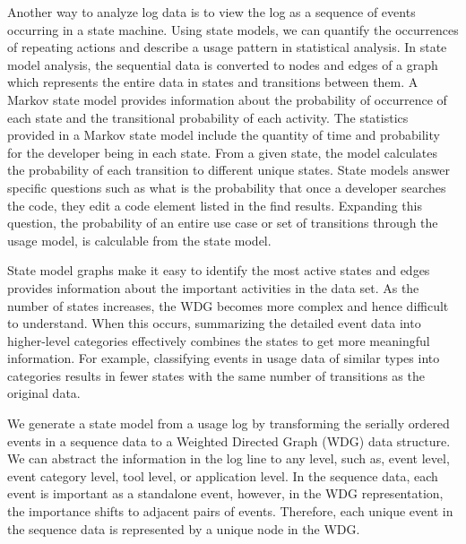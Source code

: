 Another way to analyze log data is to view the log as a sequence of events occurring in a state machine.  Using state models, we can quantify the occurrences of repeating actions and describe a usage pattern in statistical analysis.  In state model analysis, the sequential data is converted to nodes and edges of a graph which represents the entire data in states and transitions between them.  A Markov state model provides information about the probability of occurrence of each state and the transitional probability of each activity.   The statistics provided in a Markov state model include the quantity of time and probability for the developer being in each state.  From a given state, the model calculates the probability of each transition to different unique states.  State models answer specific questions such as what is the probability that once a developer searches the code, they edit a code element listed in the find results. Expanding this question, the probability of an entire use case or set of transitions through the usage model, is calculable from the state model.  

State model graphs make it easy to identify the most active states and edges provides information about the important activities in the data set.  As the number of states increases, the WDG becomes more complex and hence difficult to understand.  When this occurs, summarizing the detailed event data into higher-level categories effectively combines the states to get more meaningful information.   For example, classifying events in usage data of similar types into categories results in fewer states with the same number of transitions as the original data.

We generate a state model from a usage log by transforming the serially ordered events in a sequence data to a Weighted Directed Graph (WDG) data structure.  We can abstract the information in the log line to any level, such as, event level, event category level, tool level, or application level. In the sequence data, each event is important as a standalone event, however, in the WDG representation, the importance shifts to adjacent pairs of events. 
Therefore, each unique event in the sequence data is represented by a unique node in the WDG. 

